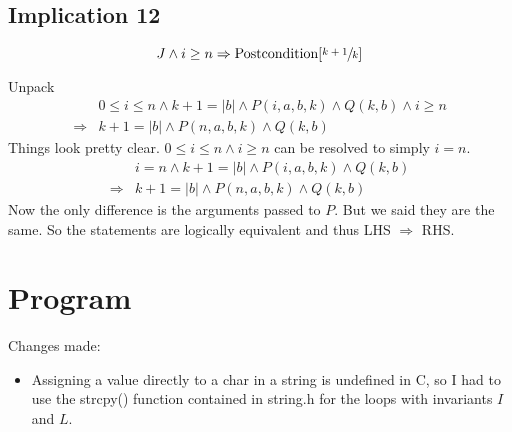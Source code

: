 \documentclass[a4paper]{article}
\begin{document}
\subsection{Implication 12}
$$ J \land i \geq n \Rightarrow \text{Postcondition}[\sfrac{k+1}{k}] $$

Unpack 
\begin{align*}
		& 0 \leq i \leq n \land k + 1 = |b| \land P(i, a, b, k) \land Q(k, b) \land i \geq n \\
		\Rightarrow & k + 1 = |b| \land P(n, a, b, k) \land Q(k, b) 
\end{align*}
Things look pretty clear. $0 \leq i \leq n \land i \geq n$ can be resolved to simply $i = n$. 
\begin{align*}
		& i = n \land k + 1 = |b| \land P(i, a, b, k) \land Q(k, b) \\
		\Rightarrow & k + 1 = |b| \land P(n, a, b, k) \land Q(k, b)
\end{align*}
Now the only difference is the arguments passed to $P$. But we said they are the same. So the statements are logically equivalent and thus LHS $\Rightarrow$ RHS.


\section{Program}


Changes made:
\begin{itemize}
		\item Assigning a value directly to a char in a string is undefined in C, so I had to use the strcpy() function contained in string.h for the loops with invariants $I$ and $L$.
\end{itemize}
\end{document}
